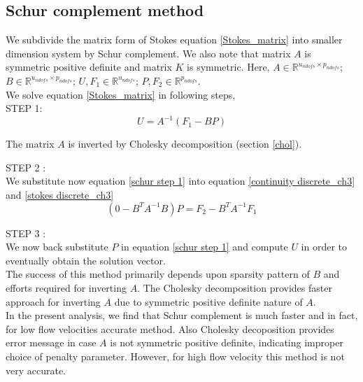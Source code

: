 \documentclass[a4paper,12pt]{book}
\begin{document}
\subsection{Schur complement method} \cite{Fritzen} \label{schur}

We subdivide the matrix form of Stokes equation \eqref{Stokes_matrix} into smaller dimension system by Schur complement. We also note that matrix $A$ is symmetric positive definite and matrix $K$ is symmetric.
Here, $A \in \mathbb{R}^{u_{ndofs} \times p_{ndofs}}$; $B \in \mathbb{R}^{u_{ndofs} \times p_{ndofs}}$; $U,F_1 \in \mathbb{R}^{u_{ndofs}}$; $P, F_2 \in \mathbb{R}^{p_{ndofs}}$. \\

We solve equation \eqref{Stokes_matrix} in following steps,\\

STEP 1: \\ 
\begin{equation}\label{schur step 1}
U = A^{-1}(F_1 - BP) 
\end{equation}

The matrix $A$ is inverted by Cholesky decomposition (section \ref{chol}). 

STEP 2 : \\
We substitute now equation \eqref{schur step 1} into equation \eqref{continuity discrete_ch3} and \eqref{stokes discrete_ch3}
\begin{equation}\label{schur step 2}
(0 - B^T A^{-1} B) P = F_2 - B^T A^{-1} F_1
\end{equation}

STEP 3 : \\
We now back substitute $P$ in equation \eqref{schur step 1} and compute $U$ in order to eventually obtain the solution vector.
\\

The success of this method primarily depends upon sparsity pattern of $B$ and efforts required for inverting $A$. The Cholesky decomposition provides faster approach for inverting $A$ due to symmetric positive definite nature of $A$. \\

In the present analysis, we find that Schur complement is much faster and in fact, for low flow velocities accurate method. Also Cholesky decoposition provides error message in case $A$ is not symmetric positive definite, indicating improper choice of penalty parameter. However, for high flow velocity this method is not very accurate. 
\end{document}
